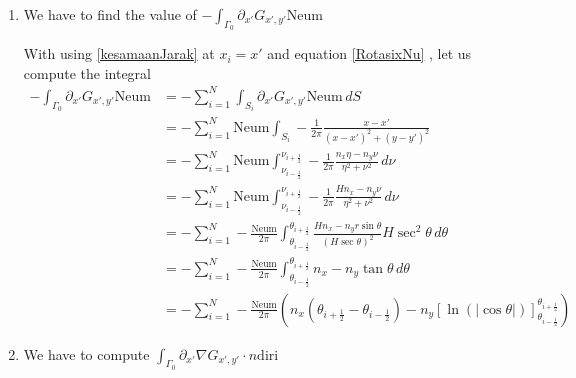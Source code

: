 \documentclass[a4paper,12pt]{article}
\newcommand{\integ}[3]{%
\ensuremath{\displaystyle{\int^{#2}_{#1} #3}}}
\begin{document}
\begin{enumerate}
 \item We have to find the value of $-\integ{\Gamma_0}{}{\partial_{x'} G_{x',y'} \text{Neum}}$


With using \ref{kesamaanJarak} at $x_i=x'$ and equation \ref{RotasixNu} , let us compute the integral
\begin{align}
 -\integ{\Gamma_0}{}{\partial_{x'} G_{x',y'} \text{Neum}}&=-\sum\limits_{i=1}^N  \integ{S_i}{}{\partial_{x'} G_{x',y'} \text{Neum} \, dS}\\
&=-\sum\limits_{i=1}^N \text{Neum} \integ{S_i}{}{-\frac{1}{2\pi}\frac{x-x'}{(x-x')^2+(y-y')^2}}\\
&=-\sum\limits_{i=1}^N \text{Neum} \integ{\nu_{i-\frac{1}{2}}}{\nu_{i+\frac{1}{2}}}{-\frac{1}{2\pi} \frac{n_x\eta-n_y \nu}{\eta^2+\nu^2} \, d\nu}\\
&=-\sum\limits_{i=1}^N \text{Neum} \integ{\nu_{i-\frac{1}{2}}}{\nu_{i+\frac{1}{2}}}{-\frac{1}{2\pi} \frac{H n_x-n_y \nu}{\eta^2+\nu^2} \, d\nu}\\
&=-\sum\limits_{i=1}^N -\frac{\text{Neum}}{2\pi} \integ{\theta_{i-\frac{1}{2}}}{\theta_{i+\frac{1}{2}}}{\frac{H n_x-n_y r \sin\theta}{\left( H\sec\theta\right)^2 }H \sec^2\theta \, d\theta}\\
&=-\sum\limits_{i=1}^N -\frac{\text{Neum}}{2\pi} \integ{\theta_{i-\frac{1}{2}}}{\theta_{i+\frac{1}{2}}}{n_x-n_y\tan\theta\, d\theta}\\
&=-\sum\limits_{i=1}^N -\frac{\text{Neum}}{2\pi} \left( n_x(\theta_{i+\frac{1}{2}}- \theta_{i-\frac{1}{2}}) -n_y \left[\ln(\vert \cos\theta\vert )\right]_{\theta_{i-\frac{1}{2}}}^{\theta_{i+\frac{1}{2}}} \right)\label{intPartialG}
\end{align}

\item We have to compute $\integ{\Gamma_0}{}{\partial_{x'}\nabla G_{x',y'} \cdot n \text{diri}}$


\end{enumerate}
\end{document}
